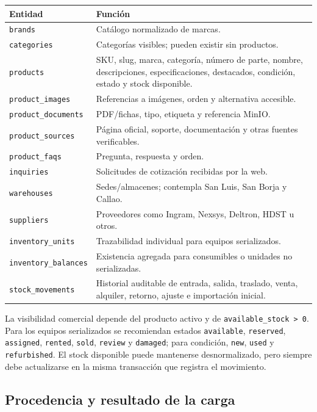\documentclass[11pt,a4paper]{article}
\newcommand{\code}[1]{\nolinkurl{#1}}
\begin{document}
\begin{longtable}{L{4.0cm}L{11.0cm}}
\toprule
\textbf{Entidad} & \textbf{Función}\\
\midrule
\endhead
\code{brands} & Catálogo normalizado de marcas.\\
\code{categories} & Categorías visibles; pueden existir sin productos.\\
\code{products} & SKU, slug, marca, categoría, número de parte, nombre, descripciones, especificaciones, destacados, condición, estado y stock disponible.\\
\code{product_images} & Referencias a imágenes, orden y alternativa accesible.\\
\code{product_documents} & PDF/fichas, tipo, etiqueta y referencia MinIO.\\
\code{product_sources} & Página oficial, soporte, documentación y otras fuentes verificables.\\
\code{product_faqs} & Pregunta, respuesta y orden.\\
\code{inquiries} & Solicitudes de cotización recibidas por la web.\\
\code{warehouses} & Sedes/almacenes; contempla San Luis, San Borja y Callao.\\
\code{suppliers} & Proveedores como Ingram, Nexsys, Deltron, HDST u otros.\\
\code{inventory_units} & Trazabilidad individual para equipos serializados.\\
\code{inventory_balances} & Existencia agregada para consumibles o unidades no serializadas.\\
\code{stock_movements} & Historial auditable de entrada, salida, traslado, venta, alquiler, retorno, ajuste e importación inicial.\\
\bottomrule
\end{longtable}

La visibilidad comercial depende del producto activo y de \code{available_stock > 0}. Para los equipos serializados se recomiendan estados \code{available}, \code{reserved}, \code{assigned}, \code{rented}, \code{sold}, \code{review} y \code{damaged}; para condición, \code{new}, \code{used} y \code{refurbished}. El stock disponible puede mantenerse desnormalizado, pero siempre debe actualizarse en la misma transacción que registra el movimiento.

\subsection{Procedencia y resultado de la carga}
\end{document}
